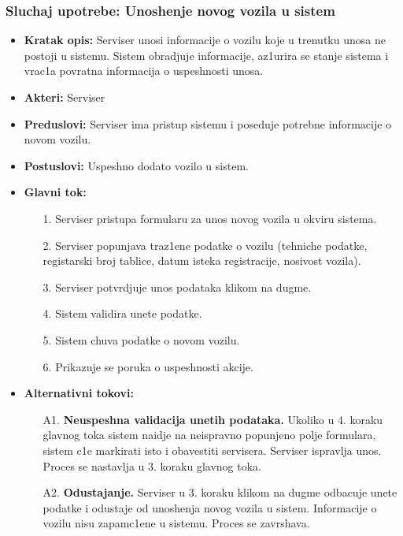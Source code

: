 \subsubsection{Sluchaj upotrebe: Unoshenje novog vozila u sistem}
\begin{itemize}
\item{\textbf{Kratak opis:} Serviser unosi informacije o vozilu koje u trenutku unosa ne postoji u sistemu. Sistem obradjuje informacije, az1urira se stanje sistema i vrac1a povratna informacija o uspeshnosti unosa.}
\item{\textbf{Akteri:} Serviser}

\item{\textbf{Preduslovi:} Serviser ima pristup sistemu i poseduje potrebne informacije o novom vozilu. }
\item{\textbf{Postuslovi:} Uspeshno dodato vozilo u sistem.}
\item{\textbf{Glavni tok:} 
\begin{enumerate}
    \item [1.] Serviser pristupa formularu za unos novog vozila u okviru sistema.
    \item[2.] Serviser popunjava traz1ene podatke o vozilu (tehniche podatke, registarski broj tablice, datum isteka registracije, nosivost vozila).
    \item[3.] Serviser potvrdjuje unos podataka klikom na dugme.
    \item[4.] Sistem validira unete podatke.
    \item[5.] Sistem chuva podatke o novom vozilu.
    \item[6.] Prikazuje se poruka o uspeshnosti akcije.
\end{enumerate}

}
\item{\textbf{Alternativni tokovi:} 
\begin{enumerate}
    \item [A1.] \textbf{Neuspeshna validacija unetih podataka.} Ukoliko u 4. koraku glavnog toka sistem naidje na neispravno popunjeno polje formulara, sistem c1e markirati isto i obavestiti servisera. Serviser ispravlja unos. Proces se nastavlja u 3. koraku glavnog toka.
    \item[A2.] \textbf{Odustajanje.} Serviser u 3. koraku klikom na dugme odbacuje unete podatke i odustaje od unoshenja novog vozila u sistem. Informacije o vozilu nisu zapamc1ene u sistemu. Proces se zavrshava.
\end{enumerate}
}
\end{itemize}

